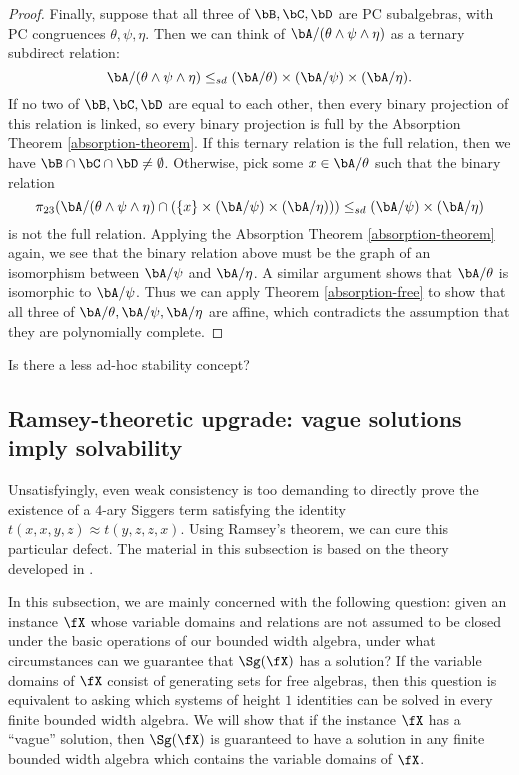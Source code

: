 \begin{proof}
Finally, suppose that all three of $\bB, \bC, \bD$ are PC subalgebras, with PC congruences $\theta, \psi, \eta$. Then we can think of $\bA/(\theta\wedge \psi \wedge \eta)$ as a ternary subdirect relation:
\[
\bA/(\theta\wedge \psi \wedge \eta) \le_{sd} (\bA/\theta) \times (\bA/\psi) \times (\bA/\eta).
\]
If no two of $\bB, \bC, \bD$ are equal to each other, then every binary projection of this relation is linked, so every binary projection is full by the Absorption Theorem \ref{absorption-theorem}. If this ternary relation is the full relation, then we have $\bB \cap \bC \cap \bD \ne \emptyset$. Otherwise, pick some $x \in \bA/\theta$ such that the binary relation
\[
\pi_{23}(\bA/(\theta\wedge \psi \wedge \eta) \cap (\{x\} \times (\bA/\psi) \times (\bA/\eta))) \le_{sd} (\bA/\psi) \times (\bA/\eta)
\]
is not the full relation. Applying the Absorption Theorem \ref{absorption-theorem} again, we see that the binary relation above must be the graph of an isomorphism between $\bA/\psi$ and $\bA/\eta$. A similar argument shows that $\bA/\theta$ is isomorphic to $\bA/\psi$. Thus we can apply Theorem \ref{absorption-free} to show that all three of $\bA/\theta, \bA/\psi, \bA/\eta$ are affine, which contradicts the assumption that they are polynomially complete.
\end{proof}

\begin{prob} Is there a less ad-hoc stability concept?
\end{prob}


\subsection{Ramsey-theoretic upgrade: vague solutions imply solvability}

Unsatisfyingly, even weak consistency is too demanding to directly prove the existence of a $4$-ary Siggers term satisfying the identity $t(x,x,y,z) \approx t(y,z,z,x)$. Using Ramsey's theorem, we can cure this particular defect. The material in this subsection is based on the theory developed in \cite{brady-chromatic}.

In this subsection, we are mainly concerned with the following question: given an instance $\fX$ whose variable domains and relations are not assumed to be closed under the basic operations of our bounded width algebra, under what circumstances can we guarantee that $\Sg(\fX)$ has a solution? If the variable domains of $\fX$ consist of generating sets for free algebras, then this question is equivalent to asking which systems of height $1$ identities can be solved in every finite bounded width algebra. We will show that if the instance $\fX$ has a ``vague'' solution, then $\Sg(\fX)$ is guaranteed to have a solution in any finite bounded width algebra which contains the variable domains of $\fX$.

